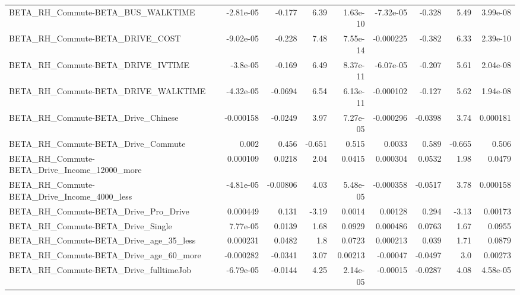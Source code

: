 \begin{tabular}{lrrrrrrrr}
BETA\_RH\_Commute-BETA\_BUS\_WALKTIME                  &   -2.81e-05 &       -0.177 &      6.39 & 1.63e-10 &  -7.32e-05 &      -0.328 &         5.49 &      3.99e-08 \\
BETA\_RH\_Commute-BETA\_DRIVE\_COST                    &   -9.02e-05 &       -0.228 &      7.48 & 7.55e-14 &  -0.000225 &      -0.382 &         6.33 &      2.39e-10 \\
BETA\_RH\_Commute-BETA\_DRIVE\_IVTIME                  &    -3.8e-05 &       -0.169 &      6.49 & 8.37e-11 &  -6.07e-05 &      -0.207 &         5.61 &      2.04e-08 \\
BETA\_RH\_Commute-BETA\_DRIVE\_WALKTIME                &   -4.32e-05 &      -0.0694 &      6.54 & 6.13e-11 &  -0.000102 &      -0.127 &         5.62 &      1.94e-08 \\
BETA\_RH\_Commute-BETA\_Drive\_Chinese                 &   -0.000158 &      -0.0249 &      3.97 & 7.27e-05 &  -0.000296 &     -0.0398 &         3.74 &      0.000181 \\
BETA\_RH\_Commute-BETA\_Drive\_Commute                 &       0.002 &        0.456 &    -0.651 &    0.515 &     0.0033 &       0.589 &       -0.665 &         0.506 \\
BETA\_RH\_Commute-BETA\_Drive\_Income\_12000\_more       &    0.000109 &       0.0218 &      2.04 &   0.0415 &   0.000304 &      0.0532 &         1.98 &        0.0479 \\
BETA\_RH\_Commute-BETA\_Drive\_Income\_4000\_less        &   -4.81e-05 &     -0.00806 &      4.03 & 5.48e-05 &  -0.000358 &     -0.0517 &         3.78 &      0.000158 \\
BETA\_RH\_Commute-BETA\_Drive\_Pro\_Drive               &    0.000449 &        0.131 &     -3.19 &   0.0014 &    0.00128 &       0.294 &        -3.13 &       0.00173 \\
BETA\_RH\_Commute-BETA\_Drive\_Single                  &    7.77e-05 &       0.0139 &      1.68 &   0.0929 &   0.000486 &      0.0763 &         1.67 &        0.0955 \\
BETA\_RH\_Commute-BETA\_Drive\_age\_35\_less             &    0.000231 &       0.0482 &       1.8 &   0.0723 &   0.000213 &       0.039 &         1.71 &        0.0879 \\
BETA\_RH\_Commute-BETA\_Drive\_age\_60\_more             &   -0.000282 &      -0.0341 &      3.07 &  0.00213 &   -0.00047 &     -0.0497 &          3.0 &       0.00273 \\
BETA\_RH\_Commute-BETA\_Drive\_fulltimeJob             &   -6.79e-05 &      -0.0144 &      4.25 & 2.14e-05 &   -0.00015 &     -0.0287 &         4.08 &      4.58e-05 \\

\end{tabular}
